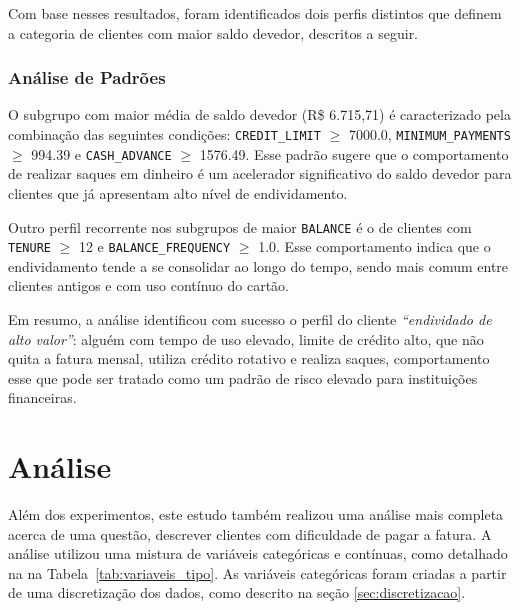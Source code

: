 \documentclass[12pt]{article}
\begin{document}
Com base nesses resultados, foram identificados dois perfis distintos que definem a categoria de clientes com maior saldo devedor, descritos a seguir.

\subsubsection{Análise de Padrões}

\hspace{1.2cm}O subgrupo com maior média de saldo devedor (R\$ 6.715,71) é caracterizado pela combinação das seguintes condições: \texttt{CREDIT\_LIMIT} $\geq$ 7000.0, \texttt{MINIMUM\_PAYMENTS} $\geq$ 994.39 e \texttt{CASH\_ADVANCE} $\geq$ 1576.49. Esse padrão sugere que o comportamento de realizar saques em dinheiro é um acelerador significativo do saldo devedor para clientes que já apresentam alto nível de endividamento.

Outro perfil recorrente nos subgrupos de maior \texttt{BALANCE} é o de clientes com \texttt{TENURE} $\geq$ 12 e \texttt{BALANCE\_FREQUENCY} $\geq$ 1.0. Esse comportamento indica que o endividamento tende a se consolidar ao longo do tempo, sendo mais comum entre clientes antigos e com uso contínuo do cartão.

Em resumo, a análise identificou com sucesso o perfil do cliente \textit{``endividado de alto valor''}: alguém com tempo de uso elevado, limite de crédito alto, que não quita a fatura mensal, utiliza crédito rotativo e realiza saques, comportamento esse que pode ser tratado como um padrão de risco elevado para instituições financeiras.

\section{Análise} \label{sec:analise}

\hspace{1.2cm}Além dos experimentos, este estudo também realizou uma análise mais completa acerca de uma questão, descrever clientes com dificuldade de pagar a fatura. A análise utilizou uma mistura de variáveis categóricas e contínuas, como detalhado na na Tabela~\ref{tab:variaveis_tipo}. As variáveis categóricas foram criadas a partir de uma discretização dos dados, como descrito na seção \ref{sec:discretizacao}.


\end{document}
